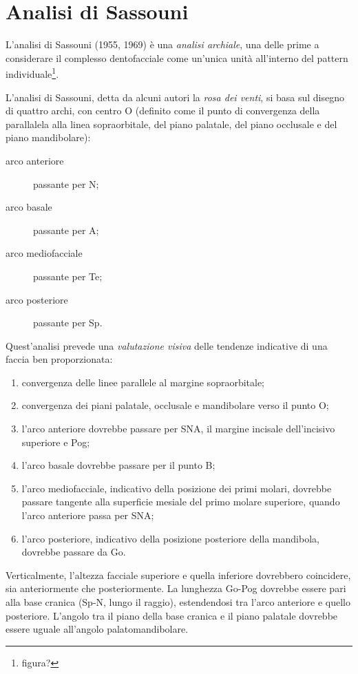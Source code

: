 \chapter{Analisi di Sassouni}
L'analisi di Sassouni (1955, 1969) è una \textit{analisi archiale}, una delle prime a considerare il complesso dentofacciale come un'unica unità all'interno del pattern individuale\footnote{figura?}.

L'analisi di Sassouni, detta da alcuni autori la \textit{rosa dei venti}, si basa sul disegno di quattro archi, con centro O (definito come il punto di convergenza della parallalela alla linea sopraorbitale, del piano palatale, del piano occlusale e del piano mandibolare):

\begin{description}
\item[arco anteriore] passante per N;
\item[arco basale] passante per A;
\item[arco mediofacciale] passante per Te;
\item[arco posteriore] passante per Sp.
\end{description}

Quest'analisi prevede una \textit{valutazione visiva} delle tendenze indicative di una faccia ben proporzionata:

\begin{enumerate}
\item convergenza delle linee parallele al margine sopraorbitale;
\item convergenza dei piani palatale, occlusale e mandibolare verso il punto O;
\item l'arco anteriore dovrebbe passare per SNA, il margine incisale dell'incisivo superiore e Pog;
\item l'arco basale dovrebbe passare per il punto B;
\item l'arco mediofacciale, indicativo della posizione dei primi molari, dovrebbe passare tangente alla superficie mesiale del primo molare superiore, quando l'arco anteriore passa per SNA;
\item l'arco posteriore, indicativo della posizione posteriore della mandibola, dovrebbe passare da Go.
\end{enumerate}

Verticalmente, l'altezza facciale superiore e quella inferiore dovrebbero coincidere, sia anteriormente che posteriormente. La lunghezza Go-Pog dovrebbe essere pari alla base cranica (Sp-N, lungo il raggio), estendendosi tra l'arco anteriore e quello posteriore. L'angolo tra il piano della base cranica e il piano palatale dovrebbe essere uguale all'angolo palatomandibolare.

